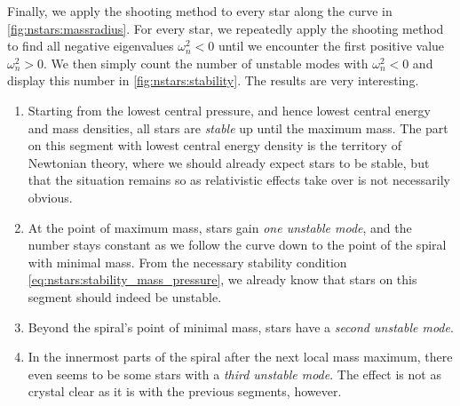 Finally, we apply the shooting method to every star along the curve in \cref{fig:nstars:massradius}.
For every star, we repeatedly apply the shooting method to find all negative eigenvalues $\omega_n^2 < 0$ until we encounter the first positive value $\omega_n^2 > 0$.
We then simply count the number of unstable modes with $\omega_n^2 < 0$ and display this number in \cref{fig:nstars:stability}.
The results are very interesting.
\begin{enumerate}
\item Starting from the lowest central pressure, and hence lowest central energy and mass densities, all stars are \emph{stable} up until the maximum mass.
      The part on this segment with lowest central energy density is the territory of Newtonian theory, where we should already expect stars to be stable, but that the situation remains so as relativistic effects take over is not necessarily obvious.
\item At the point of maximum mass, stars gain \emph{one unstable mode}, and the number stays constant as we follow the curve down to the point of the spiral with minimal mass.
      From the necessary stability condition \eqref{eq:nstars:stability_mass_pressure}, we already know that stars on this segment should indeed be unstable.
\item Beyond the spiral's point of minimal mass, stars have a \emph{second unstable mode}.
\item In the innermost parts of the spiral after the next local mass maximum, there even seems to be some stars with a \emph{third unstable mode}.
      The effect is not as crystal clear as it is with the previous segments, however.
\end{enumerate}

